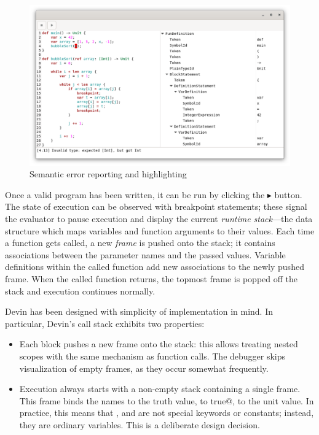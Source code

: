 \documentclass[UdineBachThesis,american,11pt]{PhdThesis}
\begin{document}
  \begin{figure}[h]
    \centering
    \includegraphics[width=\textwidth]{4.png}
    \caption{Semantic error reporting and highlighting}
  \end{figure}

  Once a valid program has been written, it can be run by clicking the
  $\blacktriangleright$ button. The state of execution can be observed with
  breakpoint statements; these signal the evaluator to pause execution and
  display the current \emph{runtime stack}---the data structure which maps
  variables and function arguments to their values. Each time a function gets
  called, a new \emph{frame} is pushed onto the stack; it contains associations
  between the parameter names and the passed values. Variable definitions within
  the called function add new associations to the newly pushed frame. When the
  called function returns, the topmost frame is popped off the stack and
  execution continues normally.

  Devin has been designed with simplicity of implementation in mind. In
  particular, Devin's call stack exhibits two properties:

  \begin{itemize}
    \item Each block pushes a new frame onto the stack: this allows treating
    nested scopes with the same mechanism as function calls. The debugger skips
    visualization of empty frames, as they occur somewhat frequently.

    \item Execution always starts with a non-empty stack containing a single
    frame. This frame binds the names \lstinline@true@ to the truth value,
    \lstinline@false@ to \lstinline@not true@, \lstinline@unit@ to the unit
    value. In practice, this means that \lstinline@true@, \lstinline@false@ and
    \lstinline@unit@ are not special keywords or constants; instead, they are
    ordinary variables. This is a deliberate design decision.
  \end{itemize}
\end{document}

